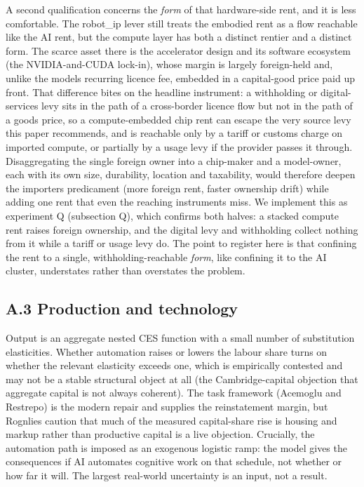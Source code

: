 \documentclass[11pt]{article}
\begin{document}
A second qualification concerns the \emph{form} of that hardware-side
rent, and it is less comfortable. The robot\_ip lever still treats the
embodied rent as a flow reachable like the AI rent, but the compute
layer has both a distinct rentier and a distinct form. The scarce asset
there is the accelerator design and its software ecosystem (the
NVIDIA-and-CUDA lock-in), whose margin is largely foreign-held and,
unlike the model\textquotesingle s recurring licence fee, embedded in a
capital-good price paid up front. That difference bites on the headline
instrument: a withholding or digital-services levy sits in the path of a
cross-border licence flow but not in the path of a goods price, so a
compute-embedded chip rent can escape the very source levy this paper
recommends, and is reachable only by a tariff or customs charge on
imported compute, or partially by a usage levy if the provider passes it
through. Disaggregating the single foreign owner into a chip-maker and a
model-owner, each with its own size, durability, location and
taxability, would therefore deepen the importer\textquotesingle s
predicament (more foreign rent, faster ownership drift) while adding one
rent that even the reaching instruments miss. We implement this as
experiment Q (subsection Q), which confirms both halves: a stacked
compute rent raises foreign ownership, and the digital levy and
withholding collect nothing from it while a tariff or usage levy do. The
point to register here is that confining the rent to a single,
withholding-reachable \emph{form}, like confining it to the AI cluster,
understates rather than overstates the problem.

\hypertarget{a.3-production-and-technology}{%
\subsection{A.3 Production and
technology}\label{a.3-production-and-technology}}

Output is an aggregate nested CES function with a small number of
substitution elasticities. Whether automation raises or lowers the
labour share turns on whether the relevant elasticity exceeds one, which
is empirically contested and may not be a stable structural object at
all (the Cambridge-capital objection that aggregate capital is not
always coherent). The task framework (Acemoglu and Restrepo) is the
modern repair and supplies the reinstatement margin, but
Rognlie\textquotesingle s caution that much of the measured
capital-share rise is housing and markup rather than productive capital
is a live objection. Crucially, the automation path is imposed as an
exogenous logistic ramp: the model gives the consequences if AI
automates cognitive work on that schedule, not whether or how far it
will. The largest real-world uncertainty is an input, not a result.
\end{document}
